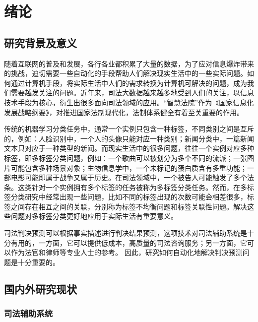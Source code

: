 
\chapter{绪论}
\section{研究背景及意义}
随着互联网的普及和发展，各行各业都积累了大量的数据，为了应对信息爆炸带来的挑战，迫切需要一些自动化的手段帮助人们解决现实生活中的一些实际问题。如何通过计算机手段，将实际生活中人们的需求转换为计算机可解决的问题，成为我们需要越发关注的问题。近年来，司法大数据越来越多地受到人们的关注，以信息技术手段为核心，衍生出很多面向司法领域的应用。“智慧法院”作为《国家信息化发展战略纲要》，对推进国家法制现代化，法制体系健全有着至关重要的作用。

传统的机器学习分类任务中，通常一个实例只包含一种标签，不同类别之间是互斥的，例如：人脸识别中，一个人的头像只能对应一种类别；新闻分类中，一篇新闻文本只对应于一种类型的新闻。而现实生活中的很多问题，往往一个实例对应多种标签，即多标签分类问题，例如：一个歌曲可以被划分为多个不同的流派；一张图片可能包含多种场景对象；生物信息学中，一个未标记的蛋白质含有多重功能；一部电影可能即属于战争又属于历史。在司法领域中，一个被告人可能触发了多个法条。这类针对一个实例拥有多个标签的任务被称为多标签分类任务。然而，在多标签分类研究中经常出现一些问题，比如不同的标签出现的次数可能会相差很多，标签之间存在相互之间的关联，分别称为标签不均衡问题和标签关联性问题。解决这些问题对多标签分类更好地应用于实际生活有重要意义。

司法判决预测可以根据事实描述进行判决结果预测，这项技术对司法辅助系统是十分有用的，一方面，它可以提供低成本，高质量的司法咨询服务；另一方面，它可以作为法官和律师等专业人士的参考。 因此，研究如何自动化地解决判决预测问题是十分重要的。




\section{国内外研究现状}
\subsection{司法辅助系统}


